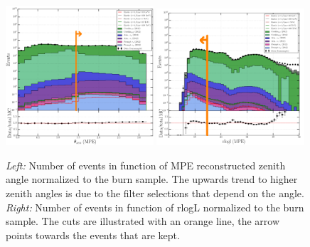 \begin{figure}[ht]
\centering
\includegraphics[width=0.49\textwidth]{chapter8/img/1D_stack_mpefit_zenith.png}
\includegraphics[width=0.49\textwidth]{chapter8/img/1D_stack_mpefit_rlogl.png}
\caption{\textit{Left: }Number of events in function of MPE reconstructed zenith angle normalized to the burn sample. The upwards trend to higher zenith angles is due to the filter selections that depend on the angle. \textit{Right: }Number of events in function of rlogL normalized to the burn sample. The cuts are illustrated with an orange line, the arrow points towards the events that are kept.}
\label{fig:level3cuts1}
\end{figure}

